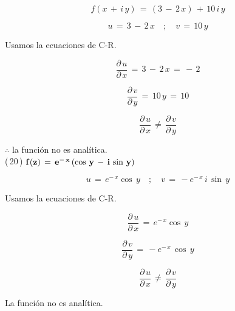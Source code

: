 \documentclass[a4paper,11pt,openany]{book}
\begin{document}
$$f(x\,+\,i\,y)\,=\,(3\,-\,2\,x)\,+\,10\,i\,y$$

$$u\,=\,3\,-\,2\,x \quad;\quad v\,=\,10\,y$$

\textcolor{ao(english)}{} Usamos la ecuaciones de C-R.

$$\dfrac{\partial\,u}{\partial\,x}\,=\,3\,-\,2\,x\,=\,-\,2$$

$$\dfrac{\partial\,v}{\partial\,y}\,=\,10\,y\,=\,10$$

$$\dfrac{\partial\,u}{\partial\,x}\,\neq\,\dfrac{\partial\,v}{\partial\,y}$$

$\therefore$ la función no es analítica.\\

\textcolor{ao(english)}{(\,20\,)} $\bf{f(z)\,=\,e^{-\,x}\,(\cos\,y\,-\,i\,\sin\,y)}$

$$u\,=\,e^{-\,x}\cos\,y \quad;\quad v\,=\,-e^{-\,x}\,i\,\sin\,y$$

\textcolor{ao(english)}{} Usamos la ecuaciones de C-R.

$$\dfrac{\partial\,u}{\partial\,x}\,=\,e^{-\,x}\cos\,y$$

$$\dfrac{\partial\,v}{\partial\,y}\,=\,-e^{-\,x}\,\cos\,y$$

$$\dfrac{\partial\,u}{\partial\,x}\,\neq\,\dfrac{\partial\,v}{\partial\,y}$$

La función no es analítica.\\
\end{document}

